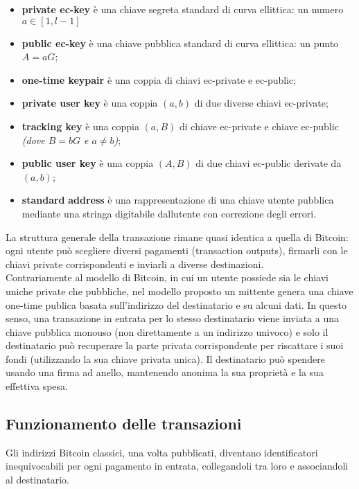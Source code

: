\begin{itemize}
  \item
    \textbf{private ec-key} è una chiave segreta standard di curva
    ellittica: un numero $a \in [1,l-1]$
  \item
    \textbf{public ec-key} è una chiave pubblica standard di curva
    ellittica: un punto $A=aG$;
  \item
    \textbf{one-time keypair} è una coppia di chiavi ec-private e
    ec-public;
  \item
    \textbf{private user key} è una coppia \emph{$(a, b)$} di due diverse
    chiavi ec-private;
  \item
    \textbf{tracking key} è una coppia \emph{$(a, B)$} di chiave ec-private
    e chiave ec-public \emph{(dove $B=bG$ e $a \neq b$)};
  \item
    \textbf{public user key} è una coppia \emph{$(A, B)$} di due chiavi
    ec-public derivate da \emph{$(a, b)$};
  \item
    \textbf{standard} \textbf{address} è una rappresentazione di una
    chiave utente pubblica mediante una stringa digitabile
    dall\textquotesingle utente con correzione degli errori.
  \end{itemize}

La struttura generale della transazione rimane quasi identica a quella
di Bitcoin: ogni utente può scegliere diversi pagamenti (transaction
outputs), firmarli con le chiavi private corrispondenti e inviarli a
diverse destinazioni.\\
Contrariamente al modello di Bitcoin, in cui un utente possiede sia le
chiavi uniche private che pubbliche, nel modello proposto un mittente
genera una chiave one-time publica basata sull'indirizzo del
destinatario e su alcuni dati. In questo senso, una transazione in
entrata per lo stesso destinatario viene inviata a una chiave pubblica
monouso (non direttamente a un indirizzo univoco) e solo il destinatario
può recuperare la parte privata corrispondente per riscattare i suoi
fondi (utilizzando la sua chiave privata unica). Il destinatario può
spendere usando una firma ad anello, mantenendo anonima la sua proprietà
e la sua effettiva spesa.

\subsection{Funzionamento delle
transazioni}\label{funzionamento-delle-transazioni}

Gli indirizzi Bitcoin classici, una volta pubblicati, diventano
identificatori inequivocabili per ogni pagamento in entrata,
collegandoli tra loro e associandoli al destinatario.

